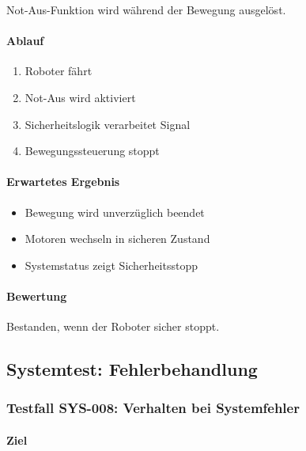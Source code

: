 Not-Aus-Funktion wird während der Bewegung ausgelöst.

\paragraph{Ablauf}\label{ablauf-30}

\begin{enumerate}
\def\labelenumi{\arabic{enumi}.}
\tightlist
\item
  Roboter fährt
\item
  Not-Aus wird aktiviert
\item
  Sicherheitslogik verarbeitet Signal
\item
  Bewegungssteuerung stoppt
\end{enumerate}

\paragraph{Erwartetes Ergebnis}\label{erwartetes-ergebnis-30}

\begin{itemize}
\tightlist
\item
  Bewegung wird unverzüglich beendet
\item
  Motoren wechseln in sicheren Zustand
\item
  Systemstatus zeigt Sicherheitsstopp
\end{itemize}

\paragraph{Bewertung}\label{bewertung-30}

Bestanden, wenn der Roboter sicher stoppt.

\subsection{Systemtest:
Fehlerbehandlung}\label{systemtest-fehlerbehandlung}

\subsubsection{Testfall SYS-008: Verhalten bei
Systemfehler}\label{testfall-sys-008-verhalten-bei-systemfehler}

\paragraph{Ziel}\label{ziel-31}

